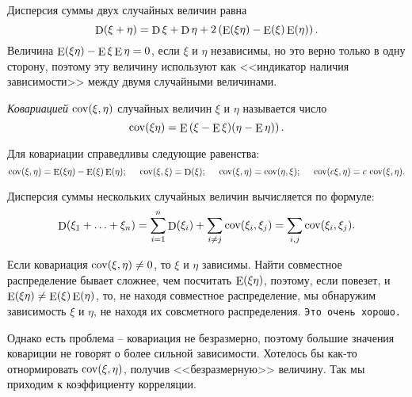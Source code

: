 Дисперсия суммы двух случайных величин равна
\begin{equation*}
    \mathop{\mathrm{D}}\nolimits (\xi + \eta) = \mathop{\mathrm{D}}\nolimits \xi + \mathop{\mathrm{D}}\nolimits \eta + 2 \left(\mathop{\mathrm{E}}\nolimits(\xi \eta) - \mathop{\mathrm{E}}\nolimits (\xi) \mathop{\mathrm{E}}\nolimits (\eta)\right).
\end{equation*}
Величина $\mathop{\mathrm{E}}\nolimits (\xi \eta) - \mathop{\mathrm{E}}\nolimits \xi \mathop{\mathrm{E}}\nolimits \eta = 0$, если $\xi$ и $\eta$ независимы, но это верно только в одну сторону, поэтому эту величину используют как <<индикатор наличия зависимости>> между двумя случайными величинами. 

\begin{to_def}
    \textit{Ковариацией} $\mathop{\mathrm{cov}}\nolimits(\xi, \eta)$ случайных величин $\xi$ и $\eta$ называется число
    \begin{equation}
        \mathop{\mathrm{cov}}\nolimits (\xi \eta) = \mathop{\mathrm{E}}\nolimits \left(\xi-\mathop{\mathrm{E}}\nolimits \xi)(\eta - \mathop{\mathrm{E}}\nolimits \eta)\right).
    \end{equation}
\end{to_def} 

\noindent
Для ковариации справедливы следующие равенства:
\begin{equation*}
    \mathop{\mathrm{cov}}\nolimits(\xi ,\eta) = \mathop{\mathrm{E}}\nolimits (\xi \eta) - \mathop{\mathrm{E}}\nolimits (\xi) \mathop{\mathrm{E}}\nolimits (\eta);
    \hspace{5 mm}
    \mathop{\mathrm{cov}}\nolimits (\xi, \xi) = \mathop{\mathrm{D}}\nolimits (\xi);
    \hspace{5 mm}   
    \mathop{\mathrm{cov}}\nolimits(\xi, \eta) = \mathop{\mathrm{cov}}\nolimits(\eta, \xi);
    \hspace{5 mm}
    \mathop{\mathrm{cov}}\nolimits (c \xi, \eta) = c \, \mathop{\mathrm{cov}}\nolimits (\xi, \eta).
\end{equation*}

\begin{to_lem}
    Дисперсия суммы нескольких случайных величин вычисляется по формуле:
    \begin{equation}
        \mathop{\mathrm{D}}\nolimits (\xi_1 + \ldots + \xi_n) = 
        \sum_{i=1}^{n} \mathop{\mathrm{D}}\nolimits (\xi_i) + \sum_{i \neq j} \mathop{\mathrm{cov}}\nolimits (\xi_i, \xi_j) 
        =
        \sum_{i, j} \mathop{\mathrm{cov}}\nolimits(\xi_i, \xi_j).
    \end{equation}
\end{to_lem}

Если ковариация $\mathop{\mathrm{cov}}\nolimits (\xi, \eta) \neq 0$, то $\xi$ и $\eta$ зависимы. Найти совместное распределение бывает сложнее, чем посчитать $\mathop{\mathrm{E}}\nolimits (\xi \eta)$, поэтому, если повезет, и $\mathop{\mathrm{E}}\nolimits (\xi \eta) \neq \mathop{\mathrm{E}}\nolimits (\xi) \mathop{\mathrm{E}}\nolimits (\eta)$, то, не находя совместное распределение, мы обнаружим зависимость $\xi$ и $\eta$, не находя их совсметного распределения.
\texttt{Это очень хорошо.} 

Однако есть проблема -- ковариация не безразмерно, поэтому большие значения ковариции не говорят о более сильной зависимости. Хотелось бы как-то отнормировать $\mathop{\mathrm{cov}}\nolimits (\xi, \eta)$, получив <<безразмерную>> величину. Так мы приходим к коэффициенту корреляции. 

